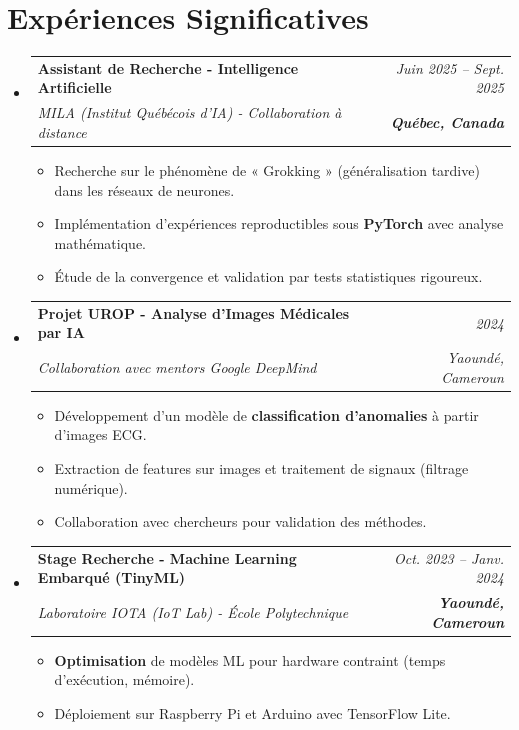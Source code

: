 \documentclass[a4paper,11pt]{article}
\makeatletter
\newcommand{\resumeSubheading}[4]{
  \vspace{-1pt}\item
    \begin{tabular*}{0.97\textwidth}[t]{l@{\extracolsep{\fill}}r}
      \textbf{#1} & \textit{\small #2} \\
      \textit{\small #3} & \textit{\small #4} \\
    \end{tabular*}\vspace{-5pt}
}
\makeatother
\begin{document}
\section{Expériences Significatives}
\begin{itemize}[leftmargin=*, label={}]

    \resumeSubheading
      {Assistant de Recherche - Intelligence Artificielle}{Juin 2025 -- Sept. 2025}
      {MILA (Institut Québécois d'IA) - Collaboration à distance}{\textbf{Québec, Canada}}
      \begin{itemize}[leftmargin=0.4cm, nosep, label=\tiny$\bullet$]
        \item \small{Recherche sur le phénomène de « Grokking » (généralisation tardive) dans les réseaux de neurones.}
        \item \small{Implémentation d'expériences reproductibles sous \textbf{PyTorch} avec analyse mathématique.}
        \item \small{Étude de la convergence et validation par tests statistiques rigoureux.}
      \end{itemize}
    \vspace{2pt}

    \resumeSubheading
      {Projet UROP - Analyse d'Images Médicales par IA}{2024}
      {Collaboration avec mentors Google DeepMind}{Yaoundé, Cameroun}
      \begin{itemize}[leftmargin=0.4cm, nosep, label=\tiny$\bullet$]
        \item \small{Développement d'un modèle de \textbf{classification d'anomalies} à partir d'images ECG.}
        \item \small{Extraction de features sur images et traitement de signaux (filtrage numérique).}
        \item \small{Collaboration avec chercheurs pour validation des méthodes.}
      \end{itemize}
    \vspace{2pt}

    \resumeSubheading
      {Stage Recherche - Machine Learning Embarqué (TinyML)}{Oct. 2023 -- Janv. 2024}
      {Laboratoire IOTA (IoT Lab) - École Polytechnique}{\textbf{Yaoundé, Cameroun}}
      \begin{itemize}[leftmargin=0.4cm, nosep, label=\tiny$\bullet$]
        \item \small{\textbf{Optimisation} de modèles ML pour hardware contraint (temps d'exécution, mémoire).}
        \item \small{Déploiement sur Raspberry Pi et Arduino avec TensorFlow Lite.}
      \end{itemize}
\end{itemize}
\end{document}
